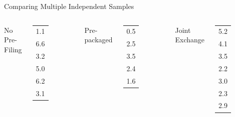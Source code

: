\begin{frame}{Comparing Multiple Independent Samples}


  \begin{columns}
    No Pre-Filing \\
    \begin{tabular}{l}
      1.1 \\ 6.6  \\ 3.2 \\ 5.0  \\ 6.2 \\ 3.1
    \end{tabular}
    Pre-packaged \\
    \begin{tabular}{l}
      0.5 \\ 2.5 \\ 3.5 \\ 2.4 \\ 1.6
    \end{tabular}
    Joint Exchange \\
    \begin{tabular}{l}
      5.2 \\ 4.1 \\ 3.5 \\ 2.2 \\ 3.0 \\ 2.3 \\ 2.9
    \end{tabular}

  \end{columns}



\end{frame}


